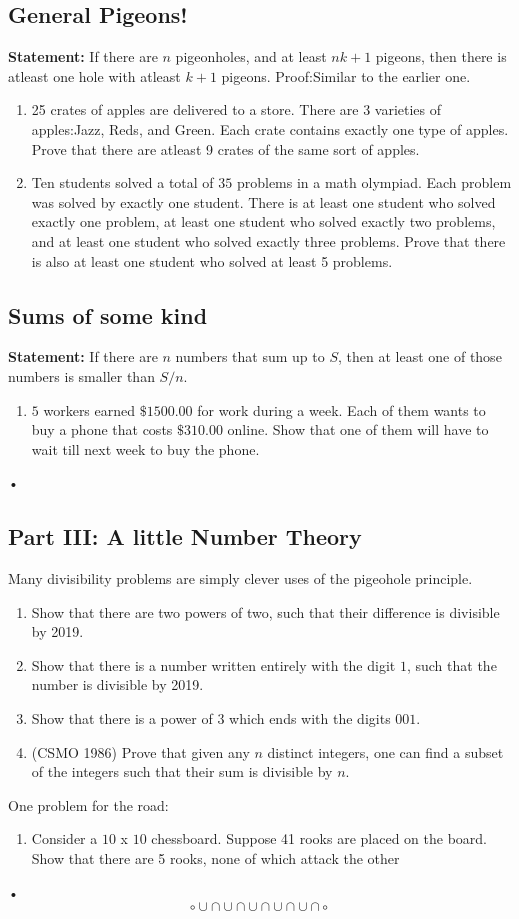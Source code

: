 \documentclass{amsart}
\begin{document}
\subsection{General Pigeons!}

\textbf{Statement:} If there are $n$ pigeonholes, and at least $nk+1$ pigeons, then there is atleast one hole with atleast $k+1$ pigeons.
Proof:Similar to the earlier one.
\begin{enumerate}
\item 25 crates of apples are delivered to a store. There are 3 varieties of apples:Jazz, Reds, and Green. Each crate contains exactly one type of apples. Prove that there are atleast 9 crates of the same sort of apples.
\item Ten students solved a total of $35$ problems in a math olympiad. Each problem was solved by exactly one student. There is at least one student who solved exactly one problem, at least one student who solved exactly two problems, and at least one student who solved exactly three problems. Prove that there is  also at least one student who solved at least 5 problems. 
\end{enumerate}

\subsection{Sums of some kind}

\textbf{Statement:} If there are $n$ numbers that sum up to $S$, then at least one of those numbers is smaller than $S/n$.

\begin{enumerate}
\item $5$ workers earned $\$ 1500.00$ for work during a week. Each of them wants to buy a phone that costs $\$ 310.00$ online. Show that one of them will have to wait till next week to buy the phone.
\end{enumerate}•

\subsection{Part III: A little Number Theory}
Many divisibility problems are simply clever uses of the pigeohole principle.
\begin{enumerate}
\item Show that there are two powers of two, such that their difference is divisible by 2019.
\item Show that there is a number written entirely with the digit $1$, such that the number is divisible by 2019.
\item Show that there is a power of $3$ which ends with the digits $001$.
\item(CSMO 1986) Prove that given any $n$ distinct integers, one can find a subset of the integers such that their sum is divisible by $n$.
\end{enumerate}
One problem for the road:

\begin{enumerate}

\item Consider a $10$ x $10$ chessboard. Suppose 41 rooks are placed on the board. Show that there are 5 rooks, none of which attack the other 

\end{enumerate}•
$$\circ\cup\cap\cup\cap\cup\cap\cup\cap\cup\cap \circ$$
\end{document}
